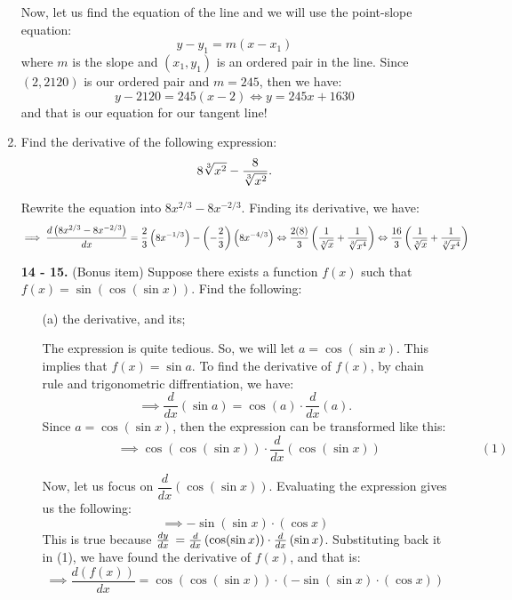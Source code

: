 \documentclass[10pt,paper=letter]{scrartcl}
\begin{document}
\begin{enumerate}[resume, label=\arabic*.,font=\bfseries]
\vspace{2mm}

Now, let us find the equation of the line and we will use the point-slope equation: $$y-y_1 = m(x-x_1)$$ where $m$ is the slope and $(x_1, y_1)$ is an ordered pair in the line. Since $(2, 2120)$ is our ordered pair and $m = 245$, then we have: $$y - 2120 = 245(x-2) \Leftrightarrow y = 245x + 1630$$ and that is our equation for our tangent line!


\item Find the derivative of the following expression: $$8\sqrt[3]{x^2} - \dfrac{8}{\sqrt[3]{x^2}}.$$


\sol Rewrite the equation into $8x^{2/3} - 8x^{-2/3}.$ Finding its derivative, we have: $$\implies \dfrac{d\left(8x^{2/3} - 8x^{-2/3}\right)}{dx} = \dfrac{2}{3}\left(8x^{-1/3}\right) - \left(-\dfrac{2}{3}\right)\left(8x^{-4/3}\right) \Leftrightarrow \dfrac{2(8)}{3}\left(\dfrac{1}{\sqrt[3]{x}} + \dfrac{1}{\sqrt[3]{x^4}}\right) \Leftrightarrow \dfrac{16}{3}\left(\dfrac{1}{\sqrt[3]{x}} + \dfrac{1}{\sqrt[3]{x^4}}\right)$$


\item[\textbf{14 - 15.}] (Bonus item) Suppose there exists a function $f(x)$ such that $f(x) = \sin (\cos (\sin x))$. Find the following:

\begin{enumerate}
    \item[(a)] the derivative, and its;
    
    
    \sol The expression is quite tedious. So, we will let $a = \cos (\sin x)$. This implies that $f(x) = \sin a$. To find the derivative of $f(x)$, by chain rule and trigonometric diffrentiation, we have: $$\implies \dfrac{d}{dx} (\sin a) = \cos (a) \cdot \dfrac{d}{dx} (a) .$$ Since $a = \cos(\sin x)$, then the expression can be transformed like this:  $$ \qquad \qquad \qquad \implies \cos(\cos (\sin x)) \cdot \dfrac{d}{dx}(\cos (\sin x)) \qquad \qquad\qquad \qquad (1)$$
    
 
    
    Now, let us focus on $\dfrac{d}{dx} (\cos (\sin x))$. Evaluating the expression gives us the following: $$\implies -\sin(\sin x) \cdot (\cos x)$$ This is true because $\frac{dy}{dx}\, = \frac{d}{dx}\,(\cos (\sin x)) \cdot \frac{d}{dx}\,(\sin x) $. Substituting back it in (1), we have found the derivative of $f(x)$, and that is: $$\implies \dfrac{d(f(x))}{dx} = \cos(\cos (\sin x)) \cdot \left(-\sin(\sin x) \cdot (\cos x)\right)$$
    

\end{enumerate}
\end{enumerate}
\end{document}
